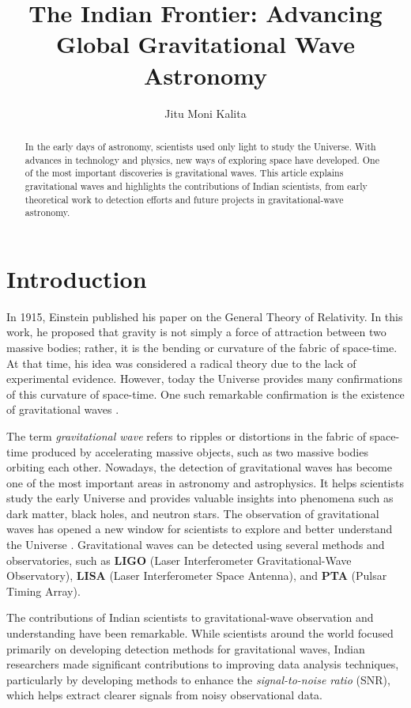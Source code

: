 \documentclass[12pt]{article}
\title{\textbf{The Indian Frontier: Advancing Global Gravitational Wave Astronomy}}
\author{Jitu Moni Kalita}
\date{}
\begin{document}
\maketitle
\doublespacing   %

\begin{abstract}
In the early days of astronomy, scientists used only light to study the Universe. With advances in technology and physics, new ways of exploring space have developed. One of the most important discoveries is gravitational waves. This article explains gravitational waves and highlights the contributions of Indian scientists, from early theoretical work to detection efforts and future projects in gravitational-wave astronomy.
\end{abstract}

\section{Introduction}

In 1915, Einstein published his paper on the General Theory of Relativity. In this work, he proposed that gravity is not simply a force of attraction between two massive bodies; rather, it is the bending or curvature of the fabric of space-time. At that time, his idea was considered a radical theory due to the lack of experimental evidence. However, today the Universe provides many confirmations of this curvature of space-time. One such remarkable confirmation is the existence of gravitational waves \cite{overduin}.

The term \textit{gravitational wave} refers to ripples or distortions in the fabric of space-time produced by accelerating massive objects, such as two massive bodies orbiting each other. Nowadays, the detection of gravitational waves has become one of the most important areas in astronomy and astrophysics. It helps scientists study the early Universe and provides valuable insights into phenomena such as dark matter, black holes, and neutron stars. The observation of gravitational waves has opened a new window for scientists to explore and better understand the Universe \cite{jia}. Gravitational waves can be detected using several methods and observatories, such as \textbf{LIGO} (Laser Interferometer Gravitational-Wave Observatory), \textbf{LISA} (Laser Interferometer Space Antenna), and \textbf{PTA} (Pulsar Timing Array).

The contributions of Indian scientists to gravitational-wave observation and understanding have been remarkable. While scientists around the world focused primarily on developing detection methods for gravitational waves, Indian researchers made significant contributions to improving data analysis techniques, particularly by developing methods to enhance the \textit{signal-to-noise ratio} (SNR), which helps extract clearer signals from noisy observational data.
\end{document}
